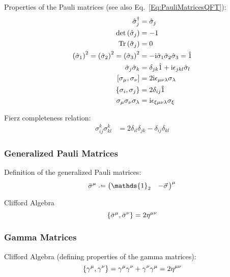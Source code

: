 			\noindent
			Properties of the Pauli matrices (see also Eq.~\ref{Eq:PauliMatricesQFT}):
			\begin{align}
				\label{Eq:PauliMatrices}
				\hat{\sigma}_j^\dagger &= \hat{\sigma}_j \\
				\det\qty(\hat{\sigma}_j) &= -1 \\
				\tr\qty(\hat{\sigma}_j) &= 0 \\
				\qty(\hat{\sigma}_1)^2 = \qty(\hat{\sigma}_2)^2 = \qty(\hat{\sigma}_3)^2 &= -\i\hat{\sigma}_1\hat{\sigma}_2\hat{\sigma}_3 = \hat{1} \\
				\hat{\sigma}_j \hat{\sigma}_k &= \delta_{jk}\hat{1} + \i\levicivita_{jkl}\hat{\sigma}_l \\
				\comm{\sigma_\mu}{\sigma_\nu} &= 2\i\levicivita_{\mu\nu\lambda}\sigma_\lambda \\
				\acomm{\sigma_i}{\sigma_j} &= 2\delta_{ij}\hat{1} \\
				\sigma_\mu \sigma_\nu \sigma_\lambda &= \i\levicivita_{\xi\mu\nu\lambda}\sigma_\xi \\
			\end{align}

			\noindent
			Fierz completeness relation:
			\begin{align}
				\sigma^k_{ij} \sigma^k_{kl} &= 2 \delta_{il} \delta_{jk} - \delta_{ij} \delta_{kl}
			\end{align}

		\subsubsection{Generalized Pauli Matrices}
		Definition of the generalized Pauli matrices:
		\begin{equation}
			\bar{\sigma}^\mu \defeq \mqty(\mathds{1}_2 & -\vec{\sigma})^\mu
		\end{equation}

		\noindent
		Clifford Algebra
		\begin{equation}
			\acomm{\bar{\sigma}^\mu}{\bar{\sigma}^\nu} = 2\eta^{\mu\nu}
		\end{equation}
		

		\subsubsection{Gamma Matrices}
			\noindent
			Clifford Algebra (defining properties of the gamma matrices):
			\begin{equation}
				\acomm{\gamma^\mu}{\gamma^\nu} = \gamma^\mu \gamma^\nu + \gamma^\nu \gamma^\mu = 2 \eta^{\mu\nu}
			\end{equation}

